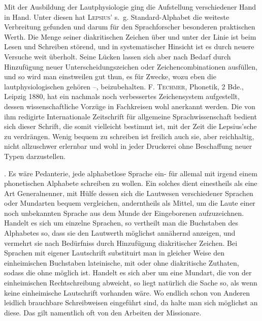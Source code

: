 Mit der Ausbildung der Lautphysiologie ging die Aufstellung verschiedener  Hand in Hand. Unter diesen hat \textsc{Lepsius}’ s.~g. Standard-Alphabet die weiteste Verbreitung gefunden und darum für den Sprachforscher besonderen praktischen Werth. Die Menge seiner diakritischen Zeichen über und unter der Linie ist beim Lesen und Schreiben  störend, und in systematischer Hinsicht ist es durch neuere Versuche weit überholt. Seine Lücken lassen sich aber nach Bedarf durch Hinzufügung neuer Unterscheidungszeichen oder Zeichencombinationen ausfüllen, und so wird man einstweilen gut thun, es für  Zwecke, wozu eben die lautphysiologischen  gehören –, beizubehalten. \textsc{F. Techmer}, Phonetik, 2 Bde., Leipzig 1880, hat ein nachmals noch verbessertes Zeichensystem aufgestellt, dessen wissenschaftliche Vorzüge in Fachkreisen wohl anerkannt werden. Die von ihm redigirte Internationale Zeitschrift für allgemeine Sprachwissenschaft bedient sich dieser Schrift, die somit vielleicht bestimmt ist, mit der Zeit die Lepsius’sche zu verdrängen. Wenig bequem zu schreiben ist freilich auch sie, aber reichhaltig, nicht allzuschwer erlernbar und wohl in jeder Druckerei ohne Beschaffung neuer Typen darzustellen.

.\label{I.V.zusatz} Es wäre Pedanterie, jede alphabetlose Sprache ein- für allemal mit irgend einem phonetischen Alphabete schreiben zu wollen. Ein solches dient \label{sp.39} einestheils als eine Art Generalnenner, mit Hülfe dessen sich die Lautwesen verschiedener Sprachen oder Mundarten bequem vergleichen, anderntheils als Mittel, um die Laute einer noch unbekannten Sprache aus dem Munde der Eingeborenen aufzuzeichnen. Handelt es sich um einzelne Sprachen, so vertheilt man die Buchstaben des Alphabetes so, dass sie den Lautwerth möglichst annähernd anzeigen, und ver\-\label{fp.39}mehrt sie nach Bedürfniss durch Hinzufügung diakritischer Zeichen. Bei Sprachen mit eigener Lautschrift substituirt man in gleicher Weise den einheimischen Buchstaben lateinische, mit oder ohne diakritische Zuthaten, sodass die  ohne  möglich ist. Handelt es sich aber um eine Mundart, die von der einheimischen Rechtschreibung abweicht, so liegt natürlich die Sache so, als wenn keine einheimische Lautschrift vorhanden wäre. Wo endlich schon von Anderen leidlich brauchbare Schreibweisen eingeführt sind, da halte man sich möglichst an diese. Das gilt namentlich oft von den Arbeiten der Missionare.

